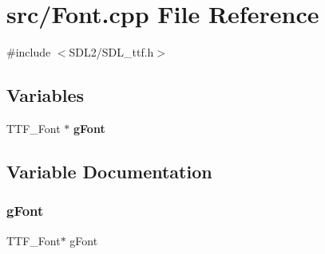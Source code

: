 \section{src/\+Font.cpp File Reference}
\label{_font_8cpp}
{\ttfamily \#include $<$S\+D\+L2/\+S\+D\+L\+\_\+ttf.\+h$>$}\newline
\subsection*{Variables}
\begin{DoxyCompactItemize}
\item 
T\+T\+F\+\_\+\+Font $\ast$ \textbf{ g\+Font}
\end{DoxyCompactItemize}


\subsection{Variable Documentation}
\mbox{\label{_font_8cpp_a88e76957ec56f067af762125afcac25f}} 
\subsubsection{g\+Font}
{\footnotesize\ttfamily T\+T\+F\+\_\+\+Font$\ast$ g\+Font}


